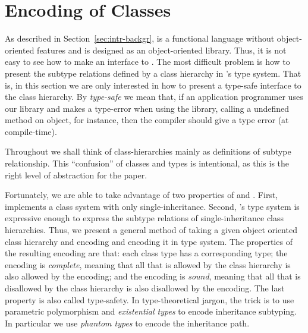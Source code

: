 \documentclass[workingdraft]{usetex-v1}
\begin{document}

\section{Encoding of Classes}
\label{sec:encoding-classes}

As described in Section~\ref{sec:intr-backgr}, \sml is a functional
language without object-oriented features and \gtk is designed as an
object-oriented library.  Thus, it is not easy to see how to make an \sml
interface to \gtk.  The most difficult problem is how to present the
subtype relations defined by a class hierarchy in \sml's type system.
That is, in this section we are only interested in how to present a
type-safe \sml interface to the \gtk class hierarchy.  By \emph{type-safe} we
mean that, if an \sml application programmer uses our library and
makes a type-error when using the \gtk library, calling a undefined
method on object, for instance, then the \sml compiler should give a
type error (at compile-time).

Throughout we shall think of class-hierarchies mainly as definitions
of subtype relationship.  This ``confusion'' of classes and types is
intentional, as this is the right level of abstraction for the paper.

Fortunately, we are able to take advantage of two properties of \gtk
and \sml.  First, \gtk implements a class system with only
single-inheritance.  Second, \sml's type system is expressive enough
to express the subtype relations of single-inheritance class
hierarchies.  Thus, we present a general method of taking a given
object oriented class hierarchy and encoding and encoding it in \sml
type system.  The properties of the resulting encoding are that: each
class type has a corresponding \sml type; the encoding is
\emph{complete}, meaning that all that is allowed by the class
hierarchy is also allowed by the encoding; and the encoding is
\emph{sound}, meaning that all that is disallowed by the class
hierarchy is also disallowed by the encoding.  The last property is
also called type-safety.  In type-theoretical jargon, the trick is to
use parametric polymorphism and \emph{existential types} to encode
inheritance subtyping.  In particular we use \emph{phantom types} to
encode the inheritance path.
\end{document}
